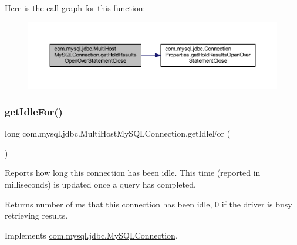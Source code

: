 Here is the call graph for this function\+:
\nopagebreak
\begin{figure}[H]
\begin{center}
\leavevmode
\includegraphics[width=350pt]{classcom_1_1mysql_1_1jdbc_1_1_multi_host_my_s_q_l_connection_a7dd4373e730d9de2a0a47b5670e157ef_cgraph}
\end{center}
\end{figure}
\mbox{\label{classcom_1_1mysql_1_1jdbc_1_1_multi_host_my_s_q_l_connection_a599b45b496d131fc0a7e56c867bbb3b0}} 
\subsubsection{\texorpdfstring{get\+Idle\+For()}{getIdleFor()}}
{\footnotesize\ttfamily long com.\+mysql.\+jdbc.\+Multi\+Host\+My\+S\+Q\+L\+Connection.\+get\+Idle\+For (\begin{DoxyParamCaption}{ }\end{DoxyParamCaption})}

Reports how long this connection has been idle. This time (reported in milliseconds) is updated once a query has completed.

\begin{DoxyReturn}{Returns}
number of ms that this connection has been idle, 0 if the driver is busy retrieving results. 
\end{DoxyReturn}


Implements \mbox{\hyperlink{interfacecom_1_1mysql_1_1jdbc_1_1_my_s_q_l_connection_a835df16f7b2e35f0729ba560fd210a2a}{com.\+mysql.\+jdbc.\+My\+S\+Q\+L\+Connection}}.

